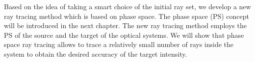Based on the idea of taking a smart choice of the initial ray set, we develop a new ray tracing method which is based on phase space. 
The phase space (PS) concept will be introduced in the next chapter. The new ray tracing method employs the PS of the source and the target of the optical systems.
We will show that phase space ray tracing allows to trace a relatively small number of rays inside the system to obtain the desired accuracy of the target intensity. 





















